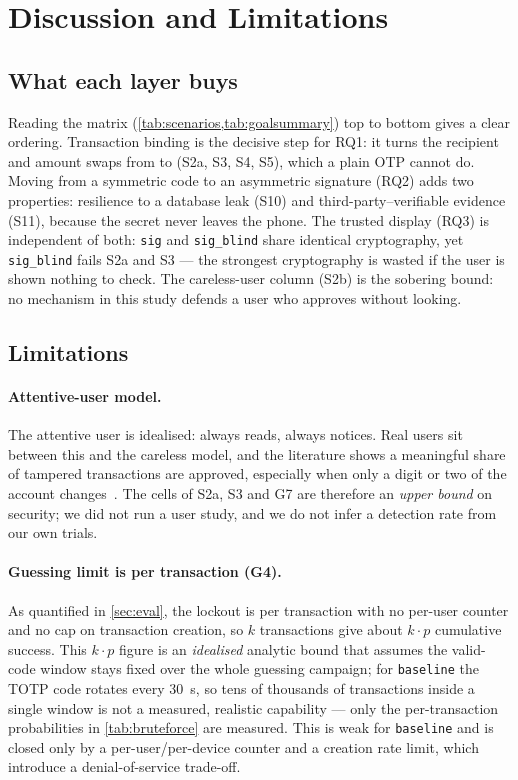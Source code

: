 \section{Discussion and Limitations}\label{sec:discussion}

\subsection{What each layer buys}
Reading the matrix (\cref{tab:scenarios,tab:goalsummary}) top to bottom gives a
clear ordering. Transaction binding is the decisive step for RQ1: it turns the
recipient and amount swaps from \xmark{} to \cmark{} (S2a, S3, S4, S5), which a
plain OTP cannot do. Moving from a symmetric code to an asymmetric signature
(RQ2) adds two properties: resilience to a database leak (S10) and
third-party--verifiable evidence (S11), because the secret never leaves the
phone. The trusted display (RQ3) is independent of both: \texttt{sig} and
\texttt{sig\_blind} share identical cryptography, yet \texttt{sig\_blind} fails
S2a and S3 --- the strongest cryptography is wasted if the user is shown nothing
to check. The careless-user column (S2b) is the sobering bound: no mechanism in
this study defends a user who approves without looking.

\subsection{Limitations}
\paragraph{Attentive-user model.}
The attentive user is idealised: always reads, always notices. Real users sit
between this and the careless model, and the literature shows a meaningful share
of tampered transactions are approved, especially when only a digit or two of the
account changes~\cite{alzomai2008,haupert2019}. The \cmark{} cells of S2a, S3 and
G7 are therefore an \emph{upper bound} on security; we did not run a user study,
and we do not infer a detection rate from our own trials.

\paragraph{Guessing limit is per transaction (G4).}
As quantified in \cref{sec:eval}, the lockout is per transaction with no per-user
counter and no cap on transaction creation, so $k$ transactions give about
$k\cdot p$ cumulative success. This $k\cdot p$ figure is an \emph{idealised}
analytic bound that assumes the valid-code window stays fixed over the whole
guessing campaign; for \texttt{baseline} the TOTP code rotates every $30$~s, so
tens of thousands of transactions inside a single window is not a measured,
realistic capability --- only the per-transaction probabilities in
\cref{tab:bruteforce} are measured. This is weak for \texttt{baseline} and is
closed only by a per-user/per-device counter and a creation rate limit, which
introduce a denial-of-service trade-off.


